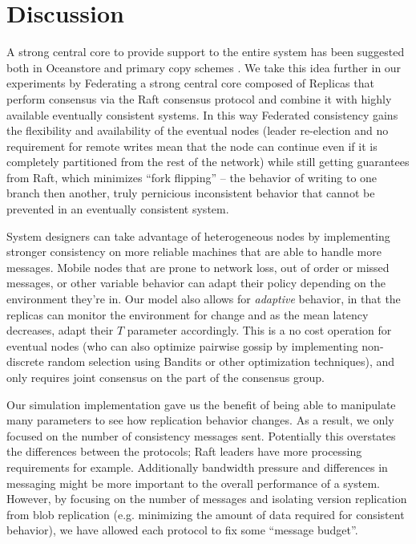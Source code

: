 \documentclass[10pt,conference,letterpaper]{IEEEtran}
\begin{document}
\section{Discussion}

A strong central core to provide support to the entire system has been suggested both in Oceanstore \cite{kubiatowicz_oceanstore:_2000} and primary copy schemes \cite{gray_dangers_1996}. We take this idea further in our experiments by Federating a strong central core composed of Replicas that perform consensus via the Raft consensus protocol and combine it with highly available eventually consistent systems. In this way Federated consistency gains the flexibility and availability of the eventual nodes (leader re-election and no requirement for remote writes mean that the node can continue even if it is completely partitioned from the rest of the network) while still getting guarantees from Raft, which minimizes ``fork flipping'' -- the behavior of writing to one branch then another, truly pernicious inconsistent behavior that cannot be prevented in an eventually consistent system.

System designers can take advantage of heterogeneous nodes by implementing stronger consistency on more reliable machines that are able to handle more messages. Mobile nodes that are prone to network loss, out of order or missed messages, or other variable behavior can adapt their policy depending on the environment they're in. Our model also allows for \textit{adaptive} behavior, in that the replicas can monitor the environment for change and as the mean latency decreases, adapt their $T$ parameter accordingly. This is a no cost operation for eventual nodes (who can also optimize pairwise gossip by implementing non-discrete random selection using Bandits or other optimization techniques), and only requires joint consensus on the part of the consensus group.

Our simulation implementation gave us the benefit of being able to manipulate many parameters to see how replication behavior changes. As a result, we only focused on the number of consistency messages sent. Potentially this overstates the differences between the protocols; Raft leaders have more processing requirements for example. Additionally bandwidth pressure and differences in messaging might be more important to the overall performance of a system. However, by focusing on the number of messages and isolating version replication from blob replication (e.g. minimizing the amount of data required for consistent behavior), we have allowed each protocol to fix some ``message budget''.
\end{document}
